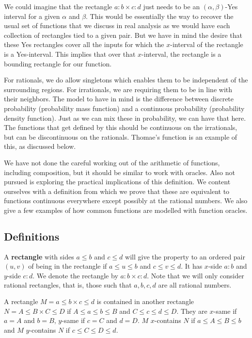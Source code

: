 \documentclass[12pt]{article}
\theoremstyle{remark}
\begin{document}
We could imagine that the rectangle $a:b \times c:d$ just needs to be an $(\alpha, \beta)$-Yes interval for a given $\alpha$ and $\beta$. This would be essentially the way to recover the usual set of functions that we discuss in real analysis as we would have each collection of rectangles tied to a given pair. But we have in mind the desire that these Yes rectangles cover all the inputs for which the $x$-interval of the rectangle is a Yes-interval. This implies that over that $x$-interval, the rectangle is a bounding rectangle for our function. 

For rationals, we do allow singletons which enables them to be independent of the surrounding regions. For irrationals, we are requiring them to be in line with their neighbors. The model to have in mind is the difference between discrete probability (probability mass function) and a continuous probability (probability density function). Just as we can mix these in probability, we can have that here. The functions that get defined by this should be continuous on the irrationals, but can be discontinuous on the rationals. Thomae's function is an example of this, as discussed below. 

We have not done the careful working out of the arithmetic of functions, including composition, but it should be similar to work with oracles. Also not pursued is exploring the practical implications of this definition. We content ourselves with a definition from which we prove that these are equivalent to functions continuous everywhere except possibly at the rational numbers. We also give a few examples of how common functions are modelled with function oracles. 

\subsection{Definitions}

A \textbf{rectangle} with sides $a \leq b$ and $c \leq d$ will give the property to an ordered pair $(u, v)$ of being in the rectangle if $a \leq u \leq b$ and $c \leq v \leq d$. It has $x$-side $a:b$ and $y$-side $c:d$. We denote the rectangle by $a:b \times c:d$. Note that we will only consider rational rectangles, that is, those such that $a, b, c, d$ are all rational numbers. 



A rectangle $M = a \leq b \times c \leq d$ is contained in another rectangle $N = A \leq B \times C \leq D$ if $A \leq a \leq b \leq B$ and $C \leq c \leq d \leq D$. They are $x$-same if $a=A$ and $b=B$, $y$-same if $c=C$ and $d=D$. $M$ $x$-contains $N$ if $a \leq A \leq B \leq b$ and $M$ $y$-contains $N$ if $c \leq C \leq D \leq d$.
\end{document}
